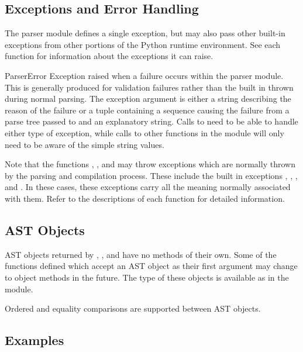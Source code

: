 \subsection{Exceptions and Error Handling}
\label{AST Errors}

The parser module defines a single exception, but may also pass other
built-in exceptions from other portions of the Python runtime
environment.  See each function for information about the exceptions
it can raise.

\begin{excdesc}{ParserError}
Exception raised when a failure occurs within the parser module.  This
is generally produced for validation failures rather than the built in
 thrown during normal parsing.
The exception argument is either a string describing the reason of the
failure or a tuple containing a sequence causing the failure from a parse
tree passed to  and an explanatory string.  Calls to
 need to be able to handle either type of exception,
while calls to other functions in the module will only need to be
aware of the simple string values.
\end{excdesc}

Note that the functions , , and
 may throw exceptions which are normally thrown by the
parsing and compilation process.  These include the built in
exceptions , ,
, and .  In these cases, these
exceptions carry all the meaning normally associated with them.  Refer
to the descriptions of each function for detailed information.


\subsection{AST Objects}
\label{AST Objects}

AST objects returned by , , and
 have no methods of their own.
Some of the functions defined which accept an AST object as their
first argument may change to object methods in the future.  The type
of these objects is available as  in the module.

Ordered and equality comparisons are supported between AST objects.


\subsection{Examples}

